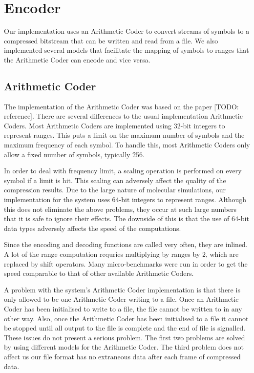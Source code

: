 \documentclass[a4paper,11pt]{report}
\begin{document}
\section{Encoder}

Our implementation uses an Arithmetic Coder to convert streams of symbols to a compressed bitstream that can be written and read from a file. We also implemented several models that facilitate the mapping of symbols to ranges that the Arithmetic Coder can encode and vice versa.

\subsection{Arithmetic Coder}

The implementation of the Arithmetic Coder was based on the paper [TODO: reference]. There are several differences to the usual implementation Arithmetic Coders. Most Arithmetic Coders are implemented using 32-bit integers to represent ranges. This puts a limit on the maximum number of symbols and the maximum frequency of each symbol. To handle this, most Arithmetic Coders only allow a fixed number of symbols, typically 256. 

In order to deal with frequency limit, a scaling operation is performed on every symbol if a limit is hit. This scaling can adversely affect the quality of the compression results. Due to the large nature of molecular simulations, our implementation for the system uses 64-bit integers to represent ranges. Although this does not eliminate the above problems, they occur at such large numbers that it is safe to ignore their effects. The downside of this is that the use of 64-bit data types adversely affects the speed of the computations. 

Since the encoding and decoding functions are called very often, they are inlined. A lot of the range computation requries multiplying by ranges by $2$, which are replaced by shift operators. Many micro-benchmarks were run in order to get the speed comparable to that of other available Arithmetic Coders.

A problem with the system's Arithmetic Coder implementation is that there is only allowed to be one Arithmetic Coder writing to a file. Once an Arithmetic Coder has been initialised to write to a file, the file cannot be written to in any other way. Also, once the Arithmetic Coder has been initialised to a file it cannot be stopped until all output to the file is complete and the end of file is signalled. These issues do not present a serious problem. The first two problems are solved by using different models for the Arithmetic Coder. The third problem does not affect us our file format has no extraneous data after each frame of compressed data.
\end{document}
